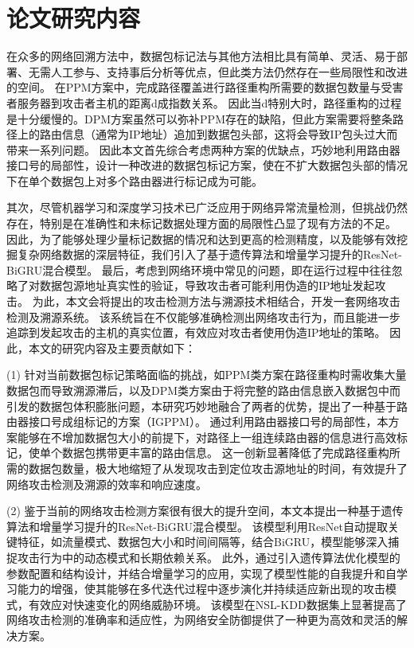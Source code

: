 \section{论文研究内容}
在众多的网络回溯方法中，数据包标记法与其他方法相比具有简单、灵活、易于部署、无需人工参与、支持事后分析等优点，但此类方法仍然存在一些局限性和改进的空间。
在PPM方案中，完成路径覆盖进行路径重构所需要的数据包数量与受害者服务器到攻击者主机的距离d成指数关系。
因此当d特别大时，路径重构的过程是十分缓慢的。DPM方案虽然可以弥补PPM存在的缺陷，但此方案需要将整条路径上的路由信息（通常为IP地址）追加到数据包头部，这将会导致IP包头过大而带来一系列问题。
因此本文首先综合考虑两种方案的优缺点，巧妙地利用路由器接口号的局部性，设计一种改进的数据包标记方案，使在不扩大数据包头部的情况下在单个数据包上对多个路由器进行标记成为可能。


其次，尽管机器学习和深度学习技术已广泛应用于网络异常流量检测，但挑战仍然存在，特别是在准确性和未标记数据处理方面的局限性凸显了现有方法的不足。
因此，为了能够处理少量标记数据的情况和达到更高的检测精度，以及能够有效挖掘复杂网络数据的深层特征，我们引入了基于遗传算法和增量学习提升的ResNet-BiGRU混合模型。
最后，考虑到网络环境中常见的问题，即在运行过程中往往忽略了对数据包源地址真实性的验证，导致攻击者可能利用伪造的IP地址发起攻击。
为此，本文会将提出的攻击检测方法与溯源技术相结合，开发一套网络攻击检测及溯源系统。
该系统旨在不仅能够准确检测出网络攻击行为，而且能进一步追踪到发起攻击的主机的真实位置，有效应对攻击者使用伪造IP地址的策略。
因此，本文的研究内容及主要贡献如下：

(1)  针对当前数据包标记策略面临的挑战，如PPM类方案在路径重构时需收集大量数据包而导致溯源滞后，以及DPM类方案由于将完整的路由信息嵌入数据包中而引发的数据包体积膨胀问题，本研究巧妙地融合了两者的优势，提出了一种基于路由器接口号成组标记的方案（IGPPM）。
通过利用路由器接口号的局部性，本方案能够在不增加数据包大小的前提下，对路径上一组连续路由器的信息进行高效标记，使单个数据包携带更丰富的路由信息。
这一创新显著降低了完成路径重构所需的数据包数量，极大地缩短了从发现攻击到定位攻击源地址的时间，有效提升了网络攻击检测及溯源的效率和响应速度。

(2)  鉴于当前的网络攻击检测方案很有很大的提升空间，本文本提出一种基于遗传算法和增量学习提升的ResNet-BiGRU混合模型。
该模型利用ResNet自动提取关键特征，如流量模式、数据包大小和时间间隔等，结合BiGRU，模型能够深入捕捉攻击行为中的动态模式和长期依赖关系。
此外，通过引入遗传算法优化模型的参数配置和结构设计，并结合增量学习的应用，实现了模型性能的自我提升和自学习能力的增强，使其能够在多代迭代过程中逐步演化并持续适应新出现的攻击模式，有效应对快速变化的网络威胁环境。
该模型在NSL-KDD数据集上显著提高了网络攻击检测的准确率和适应性，为网络安全防御提供了一种更为高效和灵活的解决方案。

